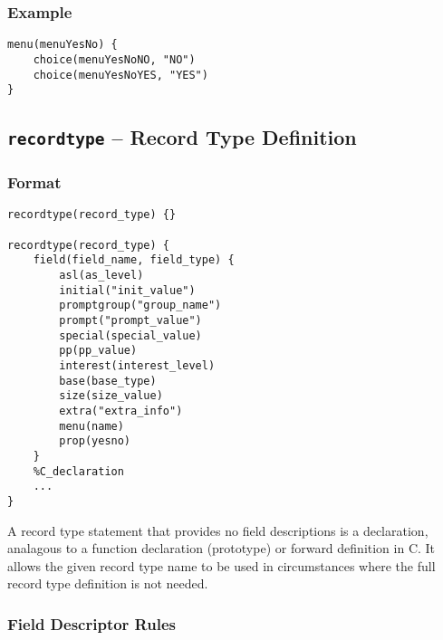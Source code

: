\subsubsection{Example}

\begin{verbatim}
menu(menuYesNo) {
    choice(menuYesNoNO, "NO")
    choice(menuYesNoYES, "YES")
}
\end{verbatim}

\subsection{\texttt{recordtype} -- Record Type Definition}

\subsubsection{Format}

\begin{verbatim}
recordtype(record_type) {}

recordtype(record_type) {
    field(field_name, field_type) {
        asl(as_level)
        initial("init_value")
        promptgroup("group_name")
        prompt("prompt_value")
        special(special_value)
        pp(pp_value)
        interest(interest_level)
        base(base_type)
        size(size_value)
        extra("extra_info")
        menu(name)
        prop(yesno)
    }
    %C_declaration
    ...
}
\end{verbatim}

A record type statement that provides no field descriptions is a declaration, analagous to a function declaration (prototype) or forward definition in C.
It allows the given record type name to be used in circumstances where the full record type definition is not needed.

\subsubsection{Field Descriptor Rules}

